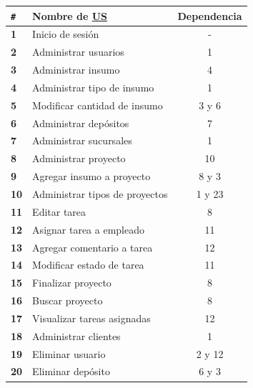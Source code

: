 \documentclass[a4paper, 12pt,twoside]{report}  %
\numberwithin{equation}{subsection} %
\begin{document}
\begin{table}[h!]
	\centering
	\begin{tabular}{ |p{0.5cm}|p{9cm}|c|  }
		\hline
		\verb|#|& \textbf{Nombre de \hyperlink{US}{US}}& \textbf{Dependencia} \\
		\hline
		\textbf{1} & \cellcolor{marca_US_realizada_anterior}Inicio de sesión & - \\
		\hline
		\textbf{2} & \cellcolor{marca_US_realizada_anterior}Administrar usuarios & 1 \\
		\hline
		\textbf{3} & \cellcolor{marca_US_realizada_anterior}Administrar insumo & 4 \\
		\hline
		\textbf{4} & \cellcolor{marca_US_realizada_anterior}Administrar tipo de insumo & 1 \\
		\hline
		\textbf{5} & \cellcolor{marca_US_realizada_anterior}Modificar cantidad de insumo & 3 y 6 \\
		\hline
		\textbf{6} & \cellcolor{marca_US_realizada_anterior}Administrar depósitos & 7 \\
		\hline
		\textbf{7} & \cellcolor{marca_US_realizada_anterior}Administrar sucursales & 1 \\
		\hline
		\textbf{8} & \cellcolor{marca_US_realizada}Administrar proyecto & 10 \\
		\hline
		\textbf{9} & Agregar insumo a proyecto & 8 y 3 \\
		\hline
		\textbf{10} & \cellcolor{marca_US_realizada}Administrar tipos de proyectos & 1 y 23 \\
		\hline
		\textbf{11} & Editar tarea & 8 \\
		\hline
		\textbf{12} & \cellcolor{marca_US_realizada}Asignar tarea a empleado & 11\\
		\hline
		\textbf{13} & Agregar comentario a tarea & 12 \\
		\hline
		\textbf{14} & Modificar estado de tarea & 11 \\
		\hline
		\textbf{15} & Finalizar proyecto & 8 \\
		\hline
		\textbf{16} & \cellcolor{marca_US_realizada}Buscar proyecto & 8 \\
		\hline
		\textbf{17} & \cellcolor{marca_US_realizada}Visualizar tareas asignadas & 12 \\
		\hline
		\textbf{18} & \cellcolor{marca_US_realizada_anterior}Administrar clientes & 1 \\
		\hline
		\textbf{19} & Eliminar usuario & 2 y 12 \\
		\hline
		\textbf{20} & Eliminar depósito & 6 y 3 \\

\end{tabular}
\end{table}
\end{document}
